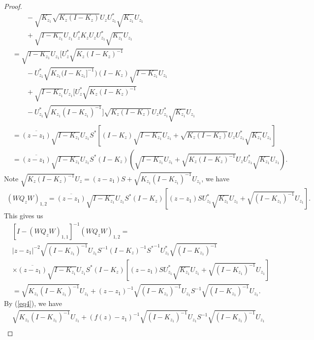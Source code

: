 \documentclass{amsart}
\begin{document}
\begin{proof}
\begin{align*}
                & \qquad -\sqrt{K_{z_1}}\sqrt{K_{z}(I-K_{z})}U_{z}U^{*}_{z_1}\sqrt{K_{z_1}}U_{z_1} \\
                & \qquad + \sqrt{I-K_{z_1}}U_{z_1}U^{*}_{z}K_{z}U_{z}U^{*}_{z_1}\sqrt{K_{z_1}}U_{z_1}\\
                & = \sqrt{I-K_{z_1}}U_{z_1}[U^{*}_{z}\sqrt{K_z(I-K_z)^{-1}} \\
                & \qquad - U^{*}_{z_1}\sqrt{K_{z_1}(I - K_{z_1}]^{-1}})(I-K_z)\sqrt{I - K_{z_1}}U_{z_1} \\
                & \qquad + \sqrt{I-K_{z_1}}U_{z_1}[U^{*}_{z}\sqrt{K_z(I-K_z)^{-1}}  \\
                & \qquad - U^{*}_{z_1}\sqrt{K_{z_1}(I - K_{z_1})^{-1}}]\sqrt{K_{z}(I-K_z)}U_{z}U^{*}_{z_1}\sqrt{K_{z_1}}U_{z_1}\\
                &= \overline{(z-z_1)}\sqrt{I-K_{z_1}}U_{z_1}S^{*}[(I-K_z)\sqrt{I - K_{z_1}}U_{z_1} + \sqrt{K_{z}(I-K_z)}U_{z}U_{z_1}^{*}\sqrt{K_{z_1}}U_{z_1}]\\
                &= \overline{(z-z_1)}\sqrt{I-K_{z_1}}U_{z_1}S^{*}(I-K_z)(\sqrt{I-K_{z_1}}U_{z_1} + \sqrt{K_z(I - K_z)^{-1}}U_{z}U_{z_1}^{*}\sqrt{K_{z_1}}U_{z_1}).
\end{align*}
Note $\sqrt{K_z(I - K_z)^{-1}}U_{z} = ( z - z_1)S + \sqrt{K_{z_1}(I - K_{z_1})^{-1}}U_{z_1}$, we have  
\begin{align*}
(WQ_{z}W)_{1,2} = \overline{(z-z_1)}\sqrt{I-K_{z_1}}U_{z_1}S^{*}(I-K_z)[(z -z_1)SU^{*}_{z_1}\sqrt{K_{z_1}}U_{z_1} + \sqrt{(I-K_{z_1})^{-1}}U_{z_1}].
\end{align*}
This gives us
\begin{align*}
&[I - (WQ_{z}W)_{1,1}]^{-1}(WQ_{z}W)_{1,2} = \\
& |z-z_1|^{-2}\sqrt{(I-K_{z_1})^{-1}}U_{z_1}S^{-1}(I-K_z)^{-1}{S^{*}}^{-1}U^{*}_{z_1}\sqrt{(I-K_{z_1})^{-1}}\\
                                          & \times  \overline{(z-z_1)}\sqrt{I-K_{z_1}}U_{z_1}S^{*}(I-K_z)[(z -z_1)SU^{*}_{z_1}\sqrt{K_{z_1}}U_{z_1} + \sqrt{(I-K_{z_1})^{-1}}U_{z_1}] \\
                                          &= \sqrt{K_{z_1}(I-K_{z_1})^{-1}}U_{z_1} + (z -z_1)^{-1} \sqrt{(I-K_{z_1})^{-1}}U_{z_1}S^{-1}\sqrt{(I-K_{z_1})^{-1}}U_{z_1}.
\end{align*}
By (\ref{eq4}), we have 
\begin{align*}
&\sqrt{K_{z_1}(I - K_{z_1})^{-1}}U_{z_1} + (f(z) - z_1)^{-1}\sqrt{(I - K_{z_1})^{-1}}U_{z_1}S^{-1}\sqrt{(I - K_{z_1})^{-1}}U_{z_1} \\

\end{align*}
\end{proof}
\end{document}
